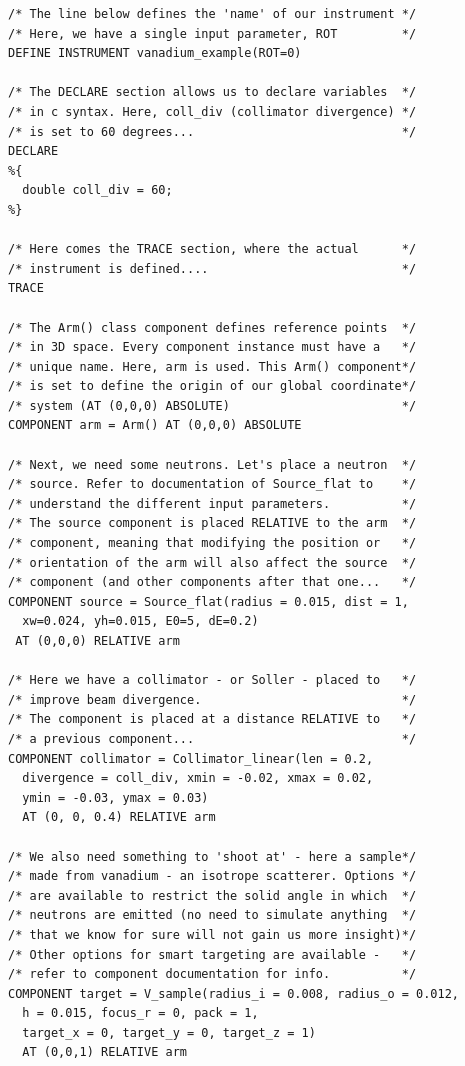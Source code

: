 \documentclass[a4paper]{article}
\begin{document}
\begin{verbatim}
/* The line below defines the 'name' of our instrument */
/* Here, we have a single input parameter, ROT         */
DEFINE INSTRUMENT vanadium_example(ROT=0)

/* The DECLARE section allows us to declare variables  */
/* in c syntax. Here, coll_div (collimator divergence) */
/* is set to 60 degrees...                             */
DECLARE
%{
  double coll_div = 60;
%}

/* Here comes the TRACE section, where the actual      */
/* instrument is defined....                           */
TRACE

/* The Arm() class component defines reference points  */
/* in 3D space. Every component instance must have a   */
/* unique name. Here, arm is used. This Arm() component*/
/* is set to define the origin of our global coordinate*/
/* system (AT (0,0,0) ABSOLUTE)                        */
COMPONENT arm = Arm() AT (0,0,0) ABSOLUTE

/* Next, we need some neutrons. Let's place a neutron  */
/* source. Refer to documentation of Source_flat to    */
/* understand the different input parameters.          */
/* The source component is placed RELATIVE to the arm  */
/* component, meaning that modifying the position or   */
/* orientation of the arm will also affect the source  */
/* component (and other components after that one...   */
COMPONENT source = Source_flat(radius = 0.015, dist = 1,
  xw=0.024, yh=0.015, E0=5, dE=0.2)
 AT (0,0,0) RELATIVE arm

/* Here we have a collimator - or Soller - placed to   */
/* improve beam divergence.                            */
/* The component is placed at a distance RELATIVE to   */
/* a previous component...                             */
COMPONENT collimator = Collimator_linear(len = 0.2, 
  divergence = coll_div, xmin = -0.02, xmax = 0.02, 
  ymin = -0.03, ymax = 0.03)
  AT (0, 0, 0.4) RELATIVE arm

/* We also need something to 'shoot at' - here a sample*/
/* made from vanadium - an isotrope scatterer. Options */
/* are available to restrict the solid angle in which  */
/* neutrons are emitted (no need to simulate anything  */
/* that we know for sure will not gain us more insight)*/
/* Other options for smart targeting are available -   */
/* refer to component documentation for info.          */
COMPONENT target = V_sample(radius_i = 0.008, radius_o = 0.012, 
  h = 0.015, focus_r = 0, pack = 1,
  target_x = 0, target_y = 0, target_z = 1)
  AT (0,0,1) RELATIVE arm


\end{verbatim}
\end{document}

